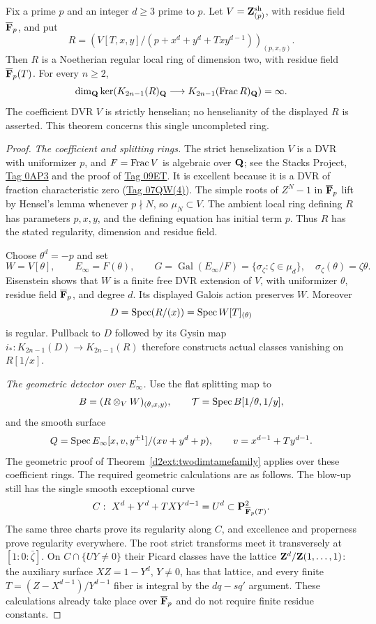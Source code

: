 \begin{theorem}
\label{d2ext:twodimstrictcoefficientinfinite}
Fix a prime $p$ and an integer $d\ge3$ prime to $p$. Let
$V=\mathbf Z_{(p)}^{\mathrm{sh}}$, with residue field $\overline{\mathbf F}_p$,
and put
\[
 R=\left(V[T,x,y]/(p+x^d+y^d+Txy^{d-1})\right)_{(p,x,y)}.
\]
Then $R$ is a Noetherian regular local ring of dimension two,
with residue field $\overline{\mathbf F}_p(T)$. For every $n\ge2$,
\[
 \dim_{\mathbf Q}\ker\!\left(K_{2n-1}(R)_{\mathbf Q}
       \longrightarrow K_{2n-1}(\operatorname{Frac} R)_{\mathbf Q}\right)=\infty.
\]
The coefficient DVR $V$ is strictly henselian; no henselianity
of the displayed $R$ is asserted. This theorem concerns this
single uncompleted ring.
\end{theorem}

\begin{proof}
\emph{The coefficient and splitting rings.}
The strict henselization $V$ is a DVR with uniformizer $p$,
and $F=\operatorname{Frac} V$ is algebraic over $\mathbf Q$; see the Stacks Project,
\href{https://stacks.math.columbia.edu/tag/0AP3}{Tag 0AP3}
and the proof of
\href{https://stacks.math.columbia.edu/tag/09ET}{Tag 09ET}.
It is excellent because it is a DVR of fraction characteristic
zero
(\href{https://stacks.math.columbia.edu/tag/07QW}{Tag 07QW(4)}).
The simple roots of $Z^N-1$ in $\overline{\mathbf F}_p$ lift by
Hensel's lemma whenever $p\nmid N$, so $\mu_N\subset V$.
The ambient local ring defining $R$ has parameters $p,x,y$,
and the defining equation has initial term $p$. Thus $R$ has
the stated regularity, dimension and residue field.

Choose $\theta^d=-p$ and set
\[
 W=V[\theta],\qquad E_\infty=F(\theta),\qquad
 G=\operatorname{Gal}(E_\infty/F)=\{\sigma_\zeta:\zeta\in\mu_d\},
 \quad \sigma_\zeta(\theta)=\zeta\theta .
\]
Eisenstein shows that $W$ is a finite free DVR extension of
$V$, with uniformizer $\theta$, residue field $\overline{\mathbf F}_p$,
and degree $d$. Its displayed Galois action preserves $W$.
Moreover
\[
 D=\operatorname{Spec}(R/(x))=\operatorname{Spec} W[T]_{(\theta)}
\]
is regular. Pullback to $D$ followed by its Gysin map
$i_*:K_{2n-1}(D)\to K_{2n-1}(R)$ therefore constructs
actual classes vanishing on $R[1/x]$.

\emph{The geometric detector over $E_\infty$.}
Use the flat splitting map to
\[
 B=(R\otimes_VW)_{(\theta,x,y)},\qquad
 \mathcal T=\operatorname{Spec} B[1/\theta,1/y],
\]
and the smooth surface
\[
 Q=\operatorname{Spec} E_\infty[x,v,y^{\pm1}]/(xv+y^d+p),
 \qquad v=x^{d-1}+Ty^{d-1}.
\]
The geometric proof of Theorem~\ref{d2ext:twodimtamefamily}
applies over these coefficient rings. The required geometric calculations are as follows.
The blow-up still has the single smooth exceptional curve
\[
 C:\ X^d+Y^d+TXY^{d-1}=U^d
       \subset\mathbf P^2_{\overline{\mathbf F}_p(T)}.
\]
The same three charts prove its regularity along $C$, and
excellence and properness prove regularity everywhere. The
root strict transforms meet it transversely at
$[1:0:\bar\zeta]$. On $C\cap\{UY\ne0\}$ their Picard
classes have the lattice $\mathbf Z^d/\mathbf Z(1,\ldots,1)$:
the auxiliary surface
$XZ=1-Y^d$, $Y\ne0$, has that lattice, and every finite
$T=(Z-X^{d-1})/Y^{d-1}$ fiber is integral by the
$dq-sq'$ argument. These calculations already take place
over $\overline{\mathbf F}_p$ and do not require finite residue
constants.


\end{proof}
